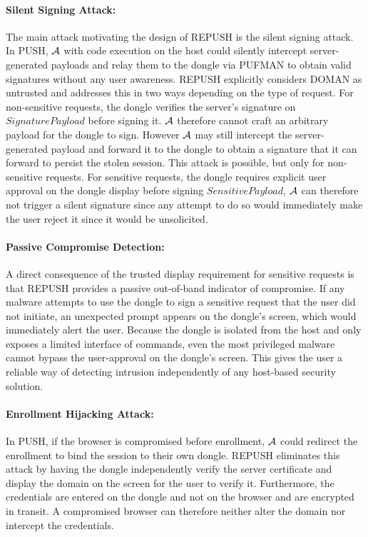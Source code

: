 \paragraph{Silent Signing Attack:} The main attack motivating the design of REPUSH is the silent signing attack. In PUSH, $\mathcal{A}$ with code execution on the host could silently intercept server-generated payloads and relay them to the dongle via PUFMAN to obtain valid signatures without any user awareness. REPUSH explicitly considers DOMAN as untrusted and addresses this in two ways depending on the type of request. For non-sensitive requests, the dongle verifies the server's signature on $SignaturePayload$ before signing it. $\mathcal{A}$ therefore cannot craft an arbitrary payload for the dongle to sign. However $\mathcal{A}$ may still intercept the server-generated payload and forward it to the dongle to obtain a signature that it can forward to persist the stolen session. This attack is possible, but only for non-sensitive requests. For sensitive requests, the dongle requires explicit user approval on the dongle display before signing $SensitivePayload$, $\mathcal{A}$ can therefore not trigger a silent signature since any attempt to do so would immediately make the user reject it since it would be unsolicited.

\paragraph{Passive Compromise Detection:} A direct consequence of the trusted display requirement for sensitive requests is that REPUSH provides a passive out-of-band indicator of compromise. If any malware attempts to use the dongle to sign a sensitive request that the user did not initiate, an unexpected prompt appears on the dongle's screen, which would immediately alert the user. Because the dongle is isolated from the host and only exposes a limited interface of commands, even the most privileged malware cannot bypass the user-approval on the dongle's screen. This gives the user a reliable way of detecting intrusion independently of any host-based security solution.

\paragraph{Enrollment Hijacking Attack:} In PUSH, if the browser is compromised before enrollment, $\mathcal{A}$ could redirect the enrollment to bind the session to their own dongle. REPUSH eliminates this attack by having the dongle independently verify the server certificate and display the domain on the screen for the user to verify it. Furthermore, the credentials are entered on the dongle and not on the browser and are encrypted in transit. A compromised browser can therefore neither alter the domain nor intercept the credentials.

